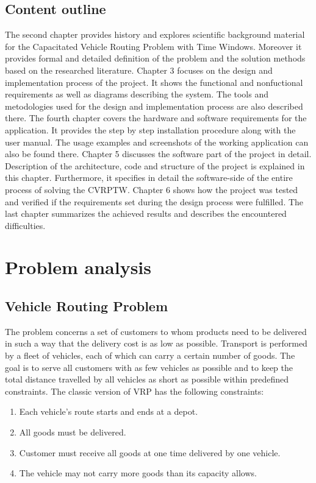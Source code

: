 \documentclass[a4paper,twoside,12pt]{book}
\begin{document}
\section{Content outline}
 The second chapter provides history and explores scientific background material for the Capacitated Vehicle Routing Problem with Time Windows. Moreover it provides formal and detailed definition of the problem and the solution methods based on the researched literature. Chapter 3 focuses on the design and implementation process of the project. It shows the functional and nonfuctional requirements as well as diagrams describing the system. The tools and metodologies used for the design and implementation process are also described there. The fourth chapter covers the hardware and software requirements for the application. It provides the step by step installation procedure along with the user manual. The usage examples and screenshots of the working application can also be found there. Chapter 5 discusses the software part of the project in detail. Description of the architecture, code and structure of the project is explained in this chapter. Furthermore, it specifies in detail the software-side of the entire process of solving the CVRPTW. Chapter 6 shows how the project was tested and verified if the requirements set during the design process were fulfilled. The last chapter summarizes the achieved results and describes the encountered difficulties.



\chapter{Problem analysis}

\section{Vehicle Routing Problem}
The problem concerns a set of customers to whom products need to be delivered in such a way that the delivery cost is as low as possible. Transport is performed by a fleet of vehicles, each of which can carry a certain number of goods. The goal is to serve all customers with as few vehicles as possible and to keep the total distance travelled by all vehicles as short as possible within predefined constraints. The classic version of VRP has the following constraints: 
\begin{enumerate}
	\item Each vehicle's route starts and ends at a depot.
	\item All goods must be delivered.
	\item Customer must receive all goods at one time delivered by one vehicle.
	\item The vehicle may not carry more goods than its capacity allows.	
\end{enumerate}
\end{document}
